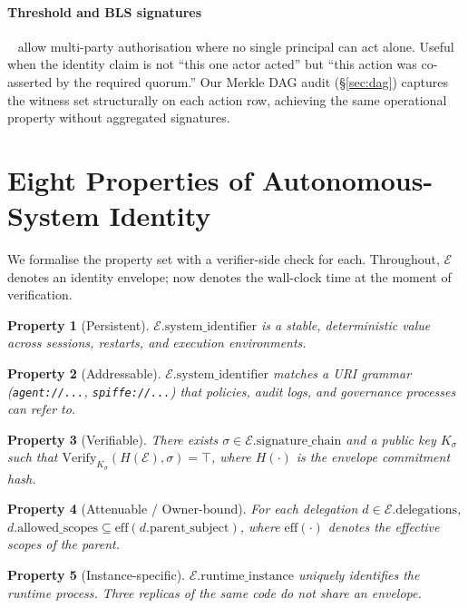 \documentclass[11pt,a4paper]{article}
\newtheorem{property}{Property}
\begin{document}
\paragraph{Threshold and BLS signatures}~\cite{bls} allow multi-party
authorisation where no single principal can act alone. Useful when the
identity claim is not ``this one actor acted'' but ``this action was
co-asserted by the required quorum.'' Our Merkle DAG audit
(\S\ref{sec:dag}) captures the witness set structurally on each action
row, achieving the same operational property without aggregated
signatures.

\section{Eight Properties of Autonomous-System Identity}\label{sec:eight-properties}

We formalise the property set with a verifier-side check for each.
Throughout, $\mathcal{E}$ denotes an identity envelope; $\mathrm{now}$
denotes the wall-clock time at the moment of verification.

\begin{property}[Persistent]
$\mathcal{E}.\text{system\_identifier}$ is a stable, deterministic value
across sessions, restarts, and execution environments.
\end{property}

\begin{property}[Addressable]
$\mathcal{E}.\text{system\_identifier}$ matches a URI grammar
(\texttt{agent://...}, \texttt{spiffe://...}) that policies, audit logs,
and governance processes can refer to.
\end{property}

\begin{property}[Verifiable]
There exists $\sigma \in \mathcal{E}.\text{signature\_chain}$ and a
public key $K_\sigma$ such that
$\mathrm{Verify}_{K_\sigma}(H(\mathcal{E}), \sigma) = \top$,
where $H(\cdot)$ is the envelope commitment hash.
\end{property}

\begin{property}[Attenuable / Owner-bound]
For each delegation $d \in \mathcal{E}.\text{delegations}$,
$d.\text{allowed\_scopes} \subseteq \text{eff}(d.\text{parent\_subject})$,
where $\text{eff}(\cdot)$ denotes the effective scopes of the parent.
\end{property}

\begin{property}[Instance-specific]
$\mathcal{E}.\text{runtime\_instance}$ uniquely identifies the runtime
process. Three replicas of the same code do not share an envelope.
\end{property}
\end{document}

